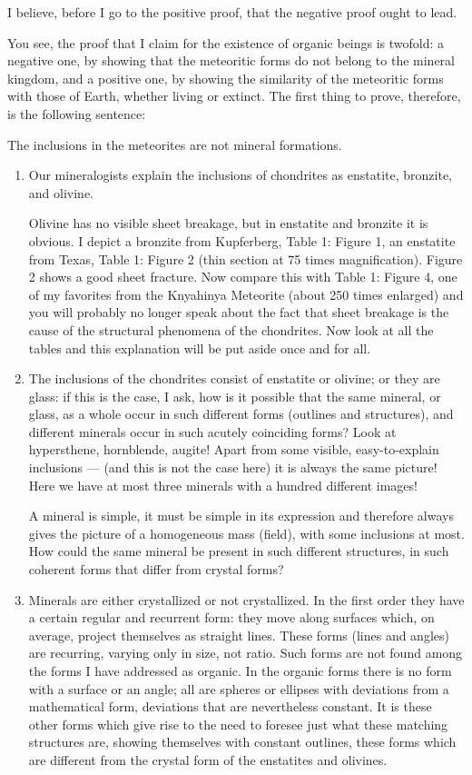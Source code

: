 \documentclass[a4paper, 12pt, oneside]{article}
\begin{document}
I believe, before I go to the positive proof, that the negative proof ought to lead.

You see, the proof that I claim for the existence of organic beings is twofold: a negative one, by showing that the meteoritic forms do not belong to the mineral kingdom, and a positive one, by showing the similarity of the meteoritic forms with those of Earth, whether living or extinct. The first thing to prove, therefore, is the following sentence:

The inclusions in the meteorites are not mineral formations.
\begin{enumerate}
    \item Our mineralogists explain the inclusions of chondrites as enstatite, bronzite, and olivine. 
    
    Olivine has no visible sheet breakage, but in enstatite and bronzite it is obvious. I depict a bronzite from Kupferberg, Table 1: Figure 1, an enstatite from Texas, Table 1: Figure 2 (thin section at 75 times magnification). Figure 2 shows a good sheet fracture. Now compare this with Table 1: Figure 4, one of my favorites from the Knyahinya Meteorite (about 250 times enlarged) and you will probably no longer speak about the fact that sheet breakage is the cause of the structural phenomena of the chondrites. Now look at all the tables and this explanation will be put aside once and for all.
    \item The inclusions of the chondrites consist of enstatite or olivine; or they are glass: if this is the case, I ask, how is it possible that the same mineral, or glass, as a whole occur in such different forms (outlines and structures), and different minerals occur in such acutely coinciding forms? Look at hypersthene, hornblende, augite! Apart from some visible, easy-to-explain inclusions --- (and this is not the case here) it is always the same picture! Here we have at most three minerals with a hundred different images!
    
    A mineral is simple, it must be simple in its expression and therefore always gives the picture of a homogeneous mass (field), with some inclusions at most. How could the same mineral be present in such different structures, in such coherent forms that differ from crystal forms?
    \item Minerals are either crystallized or not crystallized. In the first order they have a certain regular and recurrent form: they move along surfaces which, on average, project themselves as straight lines. These forms (lines and angles) are recurring, varying only in size, not ratio. Such forms are not found among the forms I have addressed as organic. In the organic forms there is no form with a surface or an angle; all are spheres or ellipses with deviations from a mathematical form, deviations that are nevertheless constant. It is these other forms which give rise to the need to foresee just what these matching structures are, showing themselves with constant outlines, these forms which are different from the crystal form of the enstatites and olivines.
    

\end{enumerate}
\end{document}
